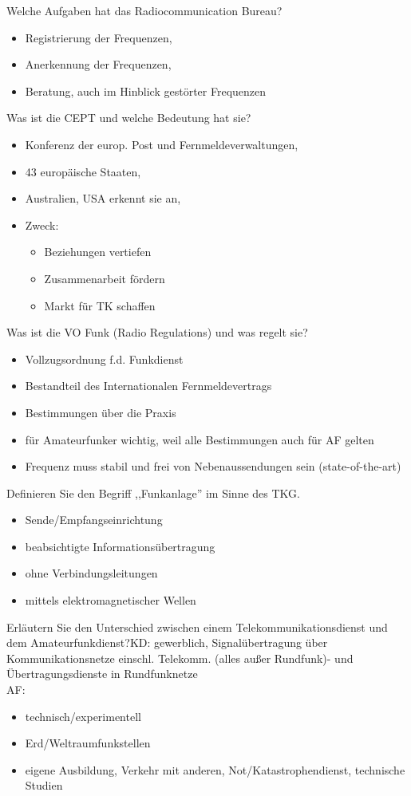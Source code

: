 \documentclass[avery5371,grid,frame,a4paper]{flashcards}
\newcommand{\card}[3]{
  \begin{flashcard}[{\chap} -- #1]{#2}#3\end{flashcard}
}
\begin{document}
\card{04}{Welche Aufgaben hat das Radiocommunication Bureau?}{\begin{itemize}\itemsep1pt \item Registrierung der Frequenzen, \item Anerkennung der Frequenzen, \item Beratung, auch im Hinblick gestörter Frequenzen
 \end{itemize}}
\card{05}{Was ist die CEPT und welche Bedeutung hat sie?}{\begin{itemize}\itemsep1pt \item	Konferenz der europ. Post und Fernmeldeverwaltungen, \item 43 europäische Staaten, \item Australien, USA erkennt sie an, \item Zweck: \begin{itemize}\itemsep1pt \item Beziehungen vertiefen \item Zusammenarbeit fördern \item Markt für TK schaffen \end{itemize} \end{itemize}}

\card{06}{Was ist die VO Funk (Radio Regulations) und was regelt sie?}{\begin{itemize}\itemsep1pt \item	Vollzugsordnung f.d. Funkdienst \item	Bestandteil des Internationalen Fernmeldevertrags \item Bestimmungen über die Praxis \item für Amateurfunker wichtig, weil alle Bestimmungen auch für AF gelten \item	Frequenz muss stabil und frei von Nebenaussendungen sein (state-of-the-art) \end{itemize}}

\card{07}{Definieren Sie den Begriff ,,Funkanlage'' im Sinne des TKG.}{\begin{itemize}\itemsep1pt \item	Sende/Empfangseinrichtung \item beabsichtigte Informationsübertragung \item	ohne Verbindungsleitungen \item	mittels elektromagnetischer Wellen \end{itemize}}

\card{08}{Erläutern Sie den Unterschied zwischen einem Telekommunikationsdienst und dem Amateurfunkdienst?}{KD: gewerblich, Signalübertragung über Kommunikationsnetze einschl. Telekomm. (alles außer Rundfunk)- und	Übertragungsdienste in Rundfunknetze \\ AF: \begin{itemize}\itemsep1pt \item technisch/experimentell \item Erd/Weltraumfunkstellen \item	eigene Ausbildung, Verkehr mit anderen, Not/Katastrophendienst, technische Studien \end{itemize}}
\end{document}
